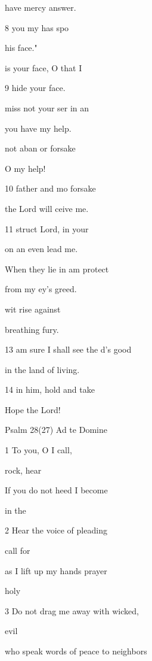 have mercy  answer. 

8  you my  has spo 

 his face." 

 is your face, O  that I  

9 hide  your face. 

miss not your ser in an 

you have  my help. 

 not aban or forsake  

O  my help! 

10  father and mo forsake  

the Lord will ceive me. 

11 struct  Lord, in your  

on an even  lead me. 

 When they lie in am protect  

from my ey's greed. 

 wit rise against  

breathing  fury. 

13  am sure I shall see the d's good 

in the land of  living. 

14  in him, hold  and take  

Hope  the Lord! 

Psalm 28(27) Ad te Domine 


1 To you, O  I call, 

  rock, hear  

If you do not heed I  become 

  in the  

2 Hear the voice of  pleading 

  call for  

as I lift up my hands  prayer 

  holy  

3 Do not drag me away with  wicked, 

  evil 

who speak words of peace to  neighbors 

